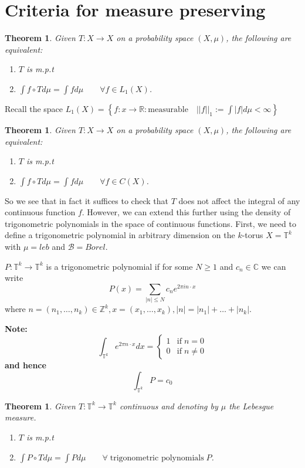 \documentclass[11pt]{article}
\newcommand{\defeq}{:=}
\newcommand{\abs}[1]{|#1|}
\newcommand{\norm}[1]{||#1||}
\newcommand{\ktor}{\mathbb{T}^k}
\newcommand{\R}{\mathbb{R}}
\newcommand{\C}{\mathbb{C}}
\newcommand{\Z}{\mathbb{Z}}
\newenvironment{defin}
	{\begin{mdframed}[backgroundcolor=white, roundcorner=5pt, linewidth=1pt]}
	{\end{mdframed}}
\newcommand{\mdf}[1]{{\color{red} #1}}
\newenvironment{note}
	{\begin{mdframed}[backgroundcolor=white, linecolor=red, roundcorner=5pt, linewidth=1pt]\bfseries{Note:}\normalfont}
	{\end{mdframed}}
\newtheorem{theorem}[prop]{Theorem}
\begin{document}
\section{Criteria for measure preserving}
\begin{theorem}
Given $T:X\to X$ on a probability space $(X,\mu)$, the following are equivalent:
\begin{enumerate}
	\item $T$ is m.p.t
	\item $\int f\circ T d\mu = \int f d\mu \quad\quad \forall f\in L_1(X)$.\end{enumerate}
\end{theorem}
Recall the space $L_1(X)=\left\{ f:x\to\R : \text{measurable}\quad \norm{f}_1 \defeq\int \abs{f} d\mu < \infty \right\}$

\begin{theorem}
Given $T:X\to X$ on a probability space $(X,\mu)$, the following are equivalent:
\begin{enumerate}
	\item $T$ is m.p.t
	\item $\int f\circ T d\mu = \int f d\mu \quad\quad \forall f\in C(X)$.
\end{enumerate}
\end{theorem}

So we see that in fact it suffices to check that $T$ does not affect the integral of any continuous function $f$.
However, we can extend this further using the density of trigonometric polynomials in the space of continuous functions. 
First, we need to define a trigonometric polynomial in arbitrary dimension on the $k$-torus $X=\ktor$ with $\mu=leb$ and $\mathcal{B}=Borel$.
\begin{defin}
	$P:\ktor\to\ktor$ is a \mdf{trigonometric polynomial} if for some $N\geq 1$ and $c_n\in\C$ we can write
	$$P(x)=\sum_{\abs{n}\leq N} c_n e^{2\pi in\cdot x}$$
	where $n=(n_1,\dots,n_k)\in\Z^k, x=(x_1,\dots,x_k), \abs{n}=\abs{n_1}+\dots+\abs{n_k}$.
\end{defin}
\begin{note}
	\[
		\int_{\ktor} e^{2\pi n\cdot x} dx =
		\begin{cases}
			1 & \text{if} \; n=0\\
			0 & \text{if} \; n\neq 0
		\end{cases}
	\]
	and hence
	$$\int_{\ktor}P = c_0$$
\end{note}

\begin{theorem}
Given $T:\ktor\to \ktor$ continuous and denoting by $\mu$ the Lebesgue measure.
\begin{enumerate}
	\item $T$ is m.p.t
	\item $\int P\circ T d\mu = \int P d\mu \quad\quad \forall\; \text{trigonometric polynomials}\; P$. 
\end{enumerate}
\end{theorem}
\end{document}
